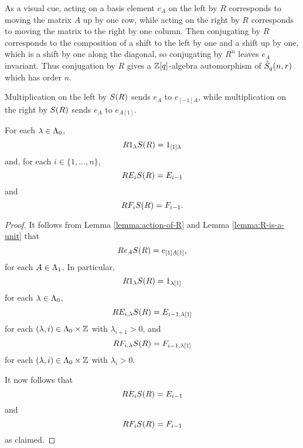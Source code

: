 \documentclass[a4paper, 11pt]{report}
\begin{document}
As a visual cue, acting on a basis element $e_A$ on the left by $R$ corresponds to moving the matrix $A$ up by one row, while acting on the right by $R$ corresponds to moving the matrix to the right by one column. Then conjugating by $R$ corresponds to the composition of a shift to the left by one and a shift up by one, which is a shift by one along the diagonal, so conjugating by $R^n$ leaves $e_A$ invariant. Thus conjugation by $R$ gives a $\mathbb{Z}[q]$-algebra automorphism of $\hat{S}_q(n,r)$ which has order $n$.

Multiplication on the left by $S{(R)}$ sends $e_A$ to $e_{[-1]A}$, while multiplication on the right by $S{(R)}$ sends $e_A$ to $e_{A[1]}$.

\begin{lemma}\label{lemma:conjugation-by-R}
For each $\lambda\in\Lambda_0{}$,
\begin{equation*}
R 1_\lambda S{(R)} = 1_{[1]\lambda}
\end{equation*}
and, for each $i\in\{1,\ldots,n\}$,
\begin{equation*}
R E_i S{(R)} = E_{i-1}
\end{equation*}
and
\begin{equation*}
R F_i S{(R)} = F_{i-1}.
\end{equation*}
\end{lemma}

\begin{proof}
It follows from Lemma \ref{lemma:action-of-R} and Lemma \ref{lemma:R-is-a-unit} that
\begin{equation*}
Re_AS{(R)} = e_{[1]A[1]},
\end{equation*}
for each $A\in\Lambda_1{}$. In particular,
\begin{equation*}
R1_\lambda S{(R)} = 1_{\lambda[1]}
\end{equation*}
for each $\lambda\in\Lambda_0{}$,
\begin{equation*}
R E_{i,\lambda} S{(R)} = E_{i-1,\lambda[1]}
\end{equation*}
for each $(\lambda,i)\in\Lambda_0{}\times\mathbb{Z}$ with $\lambda_{i+1}>0$, and
\begin{equation*}
R F_{i,\lambda} S{(R)} = F_{i-1,\lambda[1]}
\end{equation*}
for each $(\lambda,i)\in\Lambda_0{}\times\mathbb{Z}$ with $\lambda_i>0$.

It now follows that
\begin{equation*}
R E_i S{(R)} = E_{i-1}
\end{equation*}
and
\begin{equation*}
R F_i S{(R)} = F_{i-1}
\end{equation*}
as claimed.
\end{proof}
\end{document}
